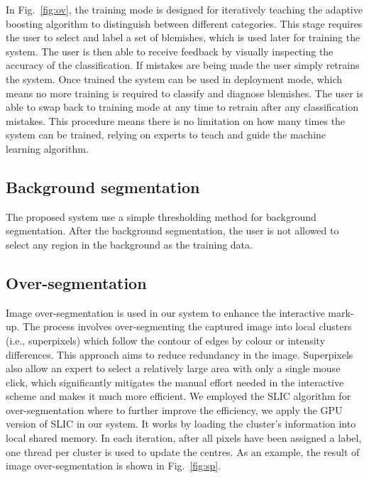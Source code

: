 \documentclass[twocolumn]{svjour3}          %
\begin{document}
In Fig.~\ref{fig:ov}, the training mode is designed for iteratively teaching the adaptive boosting algorithm to distinguish between different categories. This stage requires the user to select and label a set of blemishes, which is used later for training the system. The user is then able to receive feedback by visually inspecting the accuracy of the classification. If mistakes are being made the user simply retrains the system. Once trained the system can be used in deployment mode, which means no more training is required to classify and diagnose blemishes. The user is able to swap back to training mode at any time to retrain after any classification mistakes. This procedure means there is no limitation on how many times the system can be trained, relying on experts to teach and guide the machine learning algorithm.

\subsection{Background segmentation}
The proposed system use a simple thresholding method for background segmentation. After the background segmentation, the user is not allowed to select any region in the background as the training data.
\subsection{Over-segmentation}
Image over-segmentation is used in our system to enhance the interactive mark-up. The process involves over-segmenting the captured image into local clusters (i.e., superpixels) which follow the contour of edges by colour or intensity differences. This approach aims to reduce redundancy in the image. Superpixels also allow an expert to select a relatively large area with only a single mouse click, which significantly mitigates the manual effort needed in the interactive scheme and makes it much more efficient. We employed the SLIC algorithm \cite{AR12} for over-segmentation where to further improve the efficiency, we apply the GPU version of SLIC \cite{RY11} in our system. It works by loading the cluster's information into local shared memory. In each iteration, after all pixels have been assigned a label, one thread per cluster is used to update the centres. As an example, the result of image over-segmentation is shown in Fig.~\ref{fig:sp}.
\end{document}
